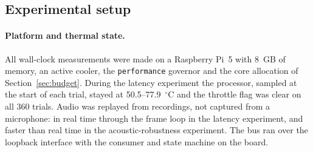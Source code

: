 \documentclass[a4paper,fleqn]{cas-dc}
\begin{document}
\subsection{Experimental setup}
\label{sec:setup}

\paragraph{Platform and thermal state.} All wall-clock measurements were made on a Raspberry Pi~5
with 8~GB of memory, an active cooler, the \texttt{performance} governor and the core allocation of
Section~\ref{sec:budget}. During the latency experiment the processor, sampled at the start of each trial, stayed at 50.5--77.9~$^\circ$C
and the throttle flag was clear on all 360 trials. Audio was replayed from recordings, not captured
from a microphone: in real time through the frame loop in the latency experiment, and faster than
real time in the acoustic-robustness experiment. The bus ran over the loopback interface
with the consumer and state machine on the board.
\end{document}

